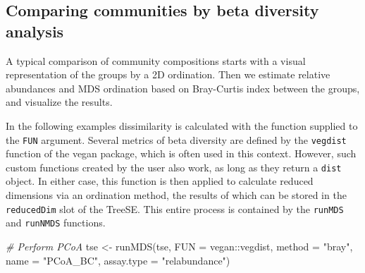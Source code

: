 \documentclass[
]{book}
\newenvironment{Shaded}{\begin{snugshade}}{\end{snugshade}}
\newcommand{\AttributeTok}[1]{\textcolor[rgb]{0.77,0.63,0.00}{#1}}
\newcommand{\CommentTok}[1]{\textcolor[rgb]{0.56,0.35,0.01}{\textit{#1}}}
\newcommand{\FunctionTok}[1]{\textcolor[rgb]{0.00,0.00,0.00}{#1}}
\newcommand{\NormalTok}[1]{#1}
\newcommand{\OtherTok}[1]{\textcolor[rgb]{0.56,0.35,0.01}{#1}}
\newcommand{\SpecialCharTok}[1]{\textcolor[rgb]{0.00,0.00,0.00}{#1}}
\newcommand{\StringTok}[1]{\textcolor[rgb]{0.31,0.60,0.02}{#1}}
\begin{document}
\begin{Shaded}
\end{Shaded}

\hypertarget{comparing-communities-by-beta-diversity-analysis}{%
\subsection{Comparing communities by beta diversity analysis}\label{comparing-communities-by-beta-diversity-analysis}}

A typical comparison of community compositions starts with a visual
representation of the groups by a 2D ordination. Then we estimate relative
abundances and MDS ordination based on Bray-Curtis index between the groups,
and visualize the results.

In the following examples dissimilarity is calculated with the function supplied
to the \texttt{FUN} argument. Several metrics of beta diversity are defined by the \texttt{vegdist}
function of the vegan package, which is often used in this context. However, such
custom functions created by the user also work, as long as they return a \texttt{dist}
object. In either case, this function is then applied to calculate reduced
dimensions via an ordination method, the results of which can be stored in the
\texttt{reducedDim} slot of the TreeSE. This entire process is contained by the \texttt{runMDS}
and \texttt{runNMDS} functions.

\begin{Shaded}
\begin{Highlighting}[]
\CommentTok{\# Perform PCoA}
\NormalTok{tse }\OtherTok{\textless{}{-}} \FunctionTok{runMDS}\NormalTok{(tse,}
              \AttributeTok{FUN =}\NormalTok{ vegan}\SpecialCharTok{::}\NormalTok{vegdist,}
              \AttributeTok{method =} \StringTok{"bray"}\NormalTok{,}
              \AttributeTok{name =} \StringTok{"PCoA\_BC"}\NormalTok{,}
              \AttributeTok{assay.type =} \StringTok{"relabundance"}\NormalTok{)}
\end{Highlighting}
\end{Shaded}
\end{document}
